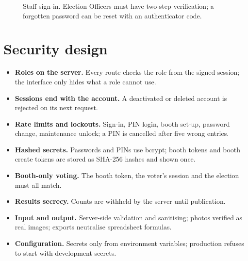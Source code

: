 \begin{figure}[H]
\centering
{}
\caption{Staff sign-in. Election Officers must have two-step verification; a forgotten password can be reset with an authenticator code.}
\end{figure}

\section{Security design}

\begin{itemize}
  \item \textbf{Roles on the server.} Every route checks the role from the signed session; the interface only hides what a role cannot use.
  \item \textbf{Sessions end with the account.} A deactivated or deleted account is rejected on its next request.
  \item \textbf{Rate limits and lockouts.} Sign-in, PIN login, booth set-up, password change, maintenance unlock; a PIN is cancelled after five wrong entries.
  \item \textbf{Hashed secrets.} Passwords and PINs use bcrypt; booth tokens and booth create tokens are stored as SHA-256 hashes and shown once.
  \item \textbf{Booth-only voting.} The booth token, the voter's session and the election must all match.
  \item \textbf{Results secrecy.} Counts are withheld by the server until publication.
  \item \textbf{Input and output.} Server-side validation and sanitising; photos verified as real images; exports neutralise spreadsheet formulas.
  \item \textbf{Configuration.} Secrets only from environment variables; production refuses to start with development secrets.
\end{itemize}

